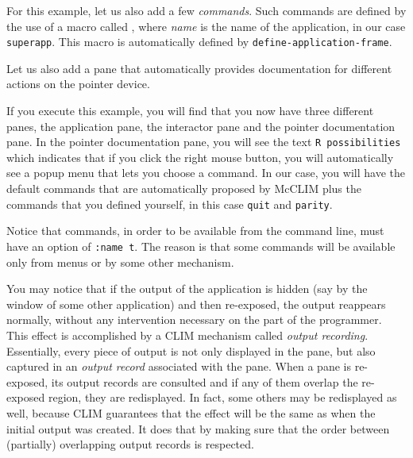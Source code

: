 For this example, let us also add a few \emph{commands}.  Such
commands are defined by the use of a macro called
, where
\textit{name} is the name of the application, in our case
\texttt{superapp}. This macro is automatically defined by
\texttt{define-application-frame}.

Let us also add a pane that automatically provides documentation for
different actions on the pointer device.

If you execute this example, you will find that you now have three
different panes, the application pane, the interactor pane and the
pointer documentation pane.  In the pointer documentation pane, you
will see the text \texttt{R possibilities} which indicates that if you
click the right mouse button, you will automatically see a popup menu
that lets you choose a command.  In our case, you will have the
default commands that are automatically proposed by McCLIM plus the
commands that you defined yourself, in this case \texttt{quit} and
\texttt{parity}.



Notice that commands, in order to be available from the command line,
must have an option of \texttt{:name t}.  The reason is that some
commands will be available only from menus or by some other mechanism.

You may notice that if the output of the application is hidden (say by
the window of some other application) and then re-exposed, the output
reappears normally, without any intervention necessary on the part of
the programmer.  This effect is accomplished by a CLIM mechanism
called \emph{output recording}.  Essentially, every piece of output is
not only displayed in the pane, but also captured in an \emph{output
  record} associated with the pane.  When a pane is re-exposed, its
output records are consulted and if any of them overlap the re-exposed
region, they are redisplayed.  In fact, some others may be redisplayed
as well, because CLIM guarantees that the effect will be the same as
when the initial output was created.  It does that by making sure that
the order between (partially) overlapping output records is respected.


